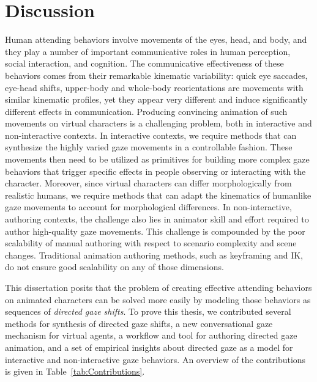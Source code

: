 \pagestyle{deposit}

\chapter{Discussion}
\label{cha:Discussion}

Human attending behaviors involve movements of the eyes, head, and body, and they play a number of important communicative roles in human perception, social interaction, and cognition. The communicative effectiveness of these behaviors comes from their remarkable kinematic variability: quick eye saccades, eye-head shifts, upper-body and whole-body reorientations are movements with similar kinematic profiles, yet they appear very different and induce significantly different effects in communication. Producing convincing animation of such movements on virtual characters is a challenging problem, both in interactive and non-interactive contexts.
In interactive contexts, we require methods that can synthesize the highly varied gaze movements in a controllable fashion. These movements then need to be utilized as primitives for building more complex gaze behaviors that trigger specific effects in people observing or interacting with the character.
Moreover, since virtual characters can differ morphologically from realistic humans, we require methods that can adapt the kinematics of humanlike gaze movements to account for morphological differences.
In non-interactive, authoring contexts, the challenge also lies in animator skill and effort required to author high-quality gaze movements. This challenge is compounded by the poor scalability of manual authoring with respect to scenario complexity and scene changes. Traditional animation authoring methods, such as keyframing and IK, do not ensure good scalability on any of those dimensions.

This dissertation posits that the problem of creating effective attending behaviors on animated characters can be solved more easily by modeling those behaviors as sequences of \emph{directed gaze shifts}. To prove this thesis, we contributed several methods for synthesis of directed gaze shifts, a new conversational gaze mechanism for virtual agents, a workflow and tool for authoring directed gaze animation, and a set of empirical insights about directed gaze as a model for interactive and non-interactive gaze behaviors. An overview of the contributions is given in Table~\ref{tab:Contributions}.

